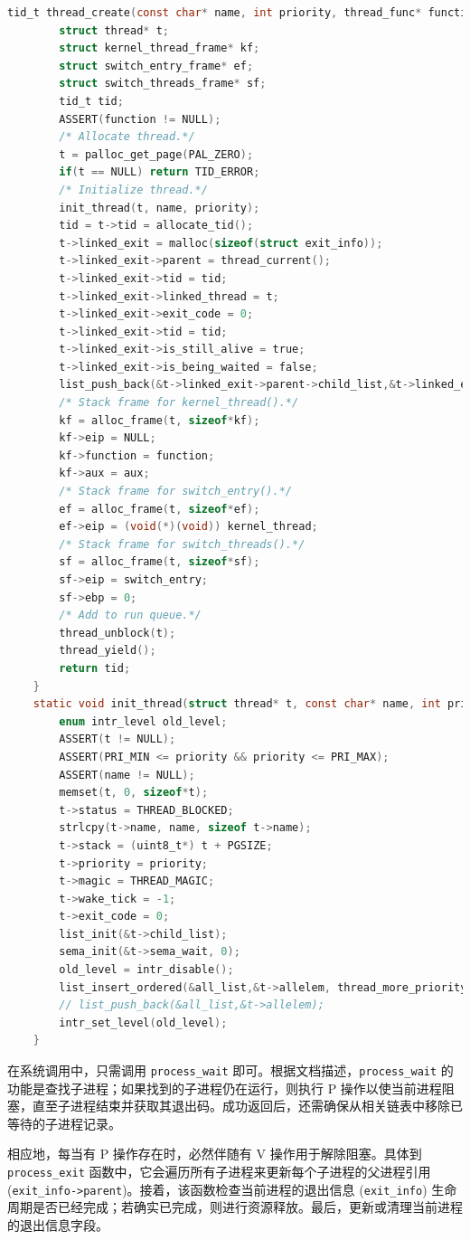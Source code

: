 \documentclass{article}
\begin{document}
\begin{lstlisting}[language=C]
	tid_t thread_create(const char* name, int priority, thread_func* function, void* aux) { 
		struct thread* t; 
		struct kernel_thread_frame* kf; 
		struct switch_entry_frame* ef; 
		struct switch_threads_frame* sf; 
		tid_t tid;
		ASSERT(function != NULL);
		/* Allocate thread.*/ 
		t = palloc_get_page(PAL_ZERO); 
		if(t == NULL) return TID_ERROR;
		/* Initialize thread.*/ 
		init_thread(t, name, priority); 
		tid = t->tid = allocate_tid();
		t->linked_exit = malloc(sizeof(struct exit_info)); 
		t->linked_exit->parent = thread_current(); 
		t->linked_exit->tid = tid; 
		t->linked_exit->linked_thread = t; 
		t->linked_exit->exit_code = 0; 
		t->linked_exit->tid = tid; 
		t->linked_exit->is_still_alive = true; 
		t->linked_exit->is_being_waited = false; 
		list_push_back(&t->linked_exit->parent->child_list,&t->linked_exit->child_elem);
		/* Stack frame for kernel_thread().*/ 
		kf = alloc_frame(t, sizeof*kf); 
		kf->eip = NULL; 
		kf->function = function; 
		kf->aux = aux;
		/* Stack frame for switch_entry().*/ 
		ef = alloc_frame(t, sizeof*ef);
		ef->eip = (void(*)(void)) kernel_thread;
		/* Stack frame for switch_threads().*/ 
		sf = alloc_frame(t, sizeof*sf); 
		sf->eip = switch_entry; 
		sf->ebp = 0;
		/* Add to run queue.*/ 
		thread_unblock(t); 
		thread_yield();
		return tid; 
	}
	static void init_thread(struct thread* t, const char* name, int priority) { 
		enum intr_level old_level;
		ASSERT(t != NULL); 
		ASSERT(PRI_MIN <= priority && priority <= PRI_MAX); 
		ASSERT(name != NULL);
		memset(t, 0, sizeof*t); 
		t->status = THREAD_BLOCKED; 
		strlcpy(t->name, name, sizeof t->name); 
		t->stack = (uint8_t*) t + PGSIZE; 
		t->priority = priority; 
		t->magic = THREAD_MAGIC; 
		t->wake_tick = -1;
		t->exit_code = 0; 
		list_init(&t->child_list); 
		sema_init(&t->sema_wait, 0);
		old_level = intr_disable();
		list_insert_ordered(&all_list,&t->allelem, thread_more_priority, NULL); 
		// list_push_back(&all_list,&t->allelem); 
		intr_set_level(old_level); 
	}
\end{lstlisting}

在系统调用中，只需调用 \texttt{process\_wait} 即可。根据文档描述，\texttt{process\_wait} 的功能是查找子进程；如果找到的子进程仍在运行，则执行 P 操作以使当前进程阻塞，直至子进程结束并获取其退出码。成功返回后，还需确保从相关链表中移除已等待的子进程记录。

相应地，每当有 P 操作存在时，必然伴随有 V 操作用于解除阻塞。具体到 \texttt{process\_exit} 函数中，它会遍历所有子进程来更新每个子进程的父进程引用 (\texttt{exit\_info->parent})。接着，该函数检查当前进程的退出信息 (\texttt{exit\_info}) 生命周期是否已经完成；若确实已完成，则进行资源释放。最后，更新或清理当前进程的退出信息字段。
\end{document}
